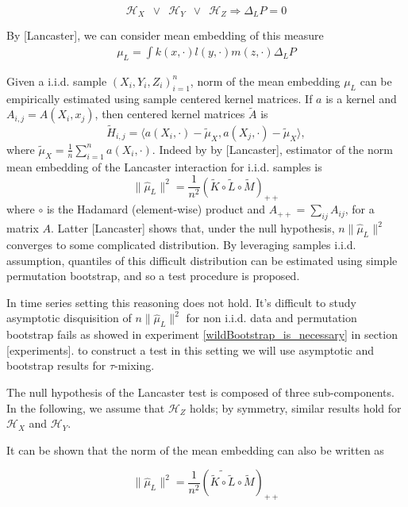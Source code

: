 \documentclass[]{article}
\begin{document}
\[\mathcal{H}_X \enspace \lor \enspace \mathcal{H}_Y \enspace \lor \enspace \mathcal{H}_Z \Rightarrow \Delta_LP=0 \]

By [Lancaster], we can consider mean embedding of this measure 
\begin{align}
 \mu_L = \int k(x,\cdot) l(y,\cdot) m(z,\cdot) \Delta_LP 
\end{align}


Given a i.i.d. sample $(X_i,Y_i,Z_i)_{i=1}^n$,  norm of the mean embedding $\mu_L$ can be empirically estimated using sample centered kernel matrices. If $a$ is a kernel and $A_{i,j} = A(X_i,x_j)$, then centered kernel matrices  $\tilde{A}$ is 
\[
\tilde{H}_{i,j} = \langle a(X_i,\cdot)-\tilde{\mu}_X, a(X_j,\cdot) -\tilde{\mu}_X \rangle,
\]
where $\tilde{\mu}_X = \frac{1}{n}\sum_{i=1}^n a(X_i,\cdot)$.  Indeed by by [Lancaster], estimator of the norm  mean embedding of the Lancaster interaction for i.i.d. samples is 
\begin{equation}\label{eqn:lancaster}
\|\hat \mu_L\|^2 = \frac{1}{n^2}\left(\tilde{K}\circ\tilde{L}\circ\tilde{M}\right)_{++}
\end{equation}
where $\circ$ is the Hadamard (element-wise) product and $A_{++} = \sum_{ij}A_{ij}$, for a matrix $A$. Latter [Lancaster] shows that, under the null hypothesis, $n \|\hat \mu_L\|^2 $ converges to some complicated distribution. By leveraging  samples i.i.d. assumption, quantiles of this difficult distribution  can be estimated using simple permutation bootstrap, and so a test procedure is proposed.

In time series setting this reasoning does not hold. It's difficult to study asymptotic disquisition of $n \|\hat \mu_L\|^2 $ for non i.i.d.  data and permutation bootstrap fails as showed in experiment \ref{wildBootstrap_is_necessary} in section [experiments]. to construct a test in this setting we will use asymptotic and bootstrap results for $\tau$-mixing. 

The null hypothesis of the Lancaster test is composed of three sub-components. In the following, we assume that $\mathcal{H}_Z$ holds; by symmetry, similar results hold for $\mathcal{H}_X$ and $\mathcal{H}_Y$.

It can be shown that the norm of the mean embedding can also be written as

\[ \|\hat \mu_L\|^2 = \frac{1}{n^2}\left(\widetilde{\tilde{K}\circ\tilde{L}}\circ\tilde{M}\right)_{++}\]
\end{document}
